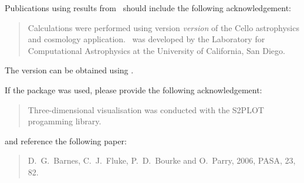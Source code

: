 \documentclass{article}
\begin{document}
Publications using results from \cello\ should include the following
acknowledgement:

\begin{quotation}
Calculations were performed using version \textit{version} of the
Cello astrophysics and cosmology application.  \cello\ was developed
by the Laboratory for Computational Astrophysics at the University of
California, San Diego.
\end{quotation}


The version can be obtained using .  


If the  package was used, please provide the following
acknowledgement:

\begin{quotation}
  Three-dimensional visualisation was conducted with the S2PLOT
   progamming library.
\end{quotation}

and reference the following paper:

\begin{quotation}
  D.~G.~Barnes, C.~J.~Fluke, P.~D.~Bourke and O.~Parry, 2006, PASA, 23, 82.
\end{quotation}
\end{document}
